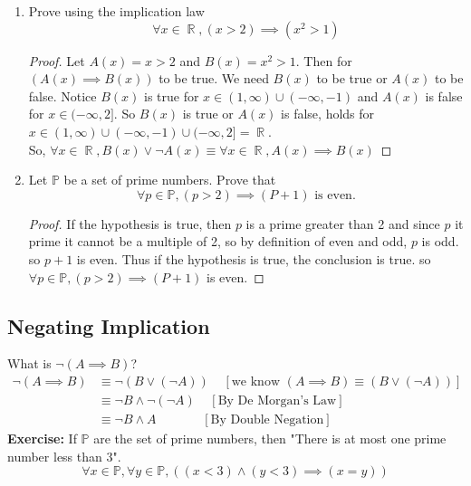 \documentclass[11pt, a4paper]{memoir}
\DeclareMathOperator{\R}{{\mathbb{R}}}
\theoremstyle{change}
\theoremstyle{plain}
\theoremstyle{nonumberplain}
\newtheorem{proof}{Proof}
\numberwithin{equation}{section}
\begin{document}
\begin{enumerate}
    \item Prove using the implication law
    $$\forall x \in \R, (x > 2) \implies (x^2 > 1)$$
    \begin{proof}
        Let $A(x) = x > 2$ and $B(x) = x^2 > 1$. Then for $(A(x) \implies B(x))$ to be true. We need $B(x)$ to be true or $A(x)$ to be false. Notice 
        $B(x)$ is true for $x \in (1, \infty) \cup (-\infty, -1)$ and $A(x)$ is false for $x \in (-\infty, 2]$. So
        $B(x)$ is true or $A(x)$ is false, holds for $x \in (1, \infty) \cup (-\infty, -1) \cup (-\infty, 2] = \R$.\\
        So, $\forall x \in \R, B(x) \vee \neg A(x) \equiv \forall x \in \R, A(x) \implies B(x)$ 
    \end{proof}
    \item Let $\mathbb{P}$ be a set of prime numbers. Prove that $$\forall p \in \mathbb{P}, (p > 2) \implies (P + 1) \text{ is even.}$$
    \begin{proof}
        If the hypothesis is true, then $p$ is a prime greater than 2 and since $p$ it
        prime it cannot be a multiple of 2, so by definition of even and odd, $p$ is odd. so $p + 1$ is even.
        Thus if the hypothesis is true, the conclusion is true. so $\forall p \in \mathbb{P}, (p > 2) \implies (P + 1)$ is even.
    \end{proof}
\end{enumerate}
\subsection{Negating Implication}
What is $\neg (A \implies B)$?
\begin{align*}
    \neg (A \implies B) &\equiv \neg (B \vee (\neg A)) \; \; \; \; [\text{we know }(A \implies B) \equiv (B \vee (\neg A))]\\
    &\equiv \neg B \wedge  \neg (\neg A) \; \; \; \; [\text{By De Morgan's Law}]\\
    &\equiv \neg B \wedge A \; \; \; \; \; \; \; \; \; \; \; \; \;[\text{By Double Negation}]
\end{align*}
\textbf{Exercise: } If $\mathbb{P}$ are the set of prime numbers, then "There is at most one prime number less than 3".
$$\forall x \in \mathbb{P}, \forall y \in \mathbb{P}, ((x < 3) \wedge (y < 3) \implies (x = y))$$
\end{document}
